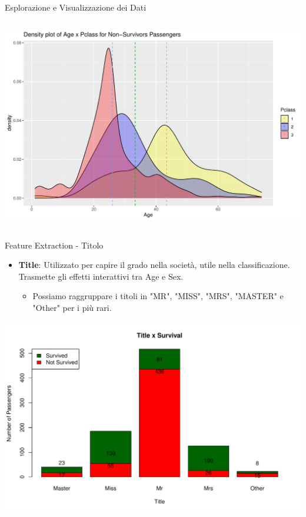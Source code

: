 \documentclass[9pt, xcolor=table]{beamer}
\begin{document}
\begin{frame}{Esplorazione e Visualizzazione dei Dati}
\begin{columns}
			\centering
			\includegraphics[scale=0.26]{density-age-pclass-notsurvived}
		\end{columns}
	\end{frame}

	\begin{frame}{Feature Extraction - Titolo}
		\begin{itemize}
			\item \textbf{Title}: Utilizzato per capire il grado nella società, utile nella classificazione. Trasmette gli effetti interattivi tra Age e Sex.
			\begin{itemize}
				\item Possiamo raggruppare i titoli in "MR", "MISS", "MRS",
				"MASTER" e "Other" per i più rari.
			\end{itemize}
		\end{itemize}
	
		\centering
		\includegraphics[scale=0.4]{barplot-title-survival}
	\end{frame}
\end{document}
